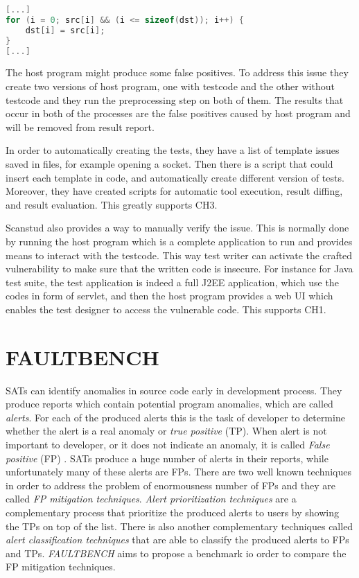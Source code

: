 \documentclass[authoryear,preprint]{sigplanconf}
\begin{document}
\begin{lstlisting}[float,caption=Off-by-one vulnerability caused by insecure loop condition \cite{Scanstud} ,label=ls:sourcec,language=C]
[...]
for (i = 0; src[i] && (i <= sizeof(dst)); i++) {
	dst[i] = src[i];
}
[...]
\end{lstlisting}

The host program might produce some false positives. To address this issue they create two versions of host program, one with testcode and the other without testcode and they run the preprocessing step on both of them. The results that occur in both of the processes are the false positives caused by host program and will be removed from result report. 

In order to automatically creating the tests, they have a list of template issues saved in files, for example opening a socket. Then there is a script that could insert each template in code, and automatically create different version of tests. Moreover, they have created scripts for automatic tool execution, result diffing, and result evaluation. This greatly supports CH3.

Scanstud also provides a way to manually verify the issue. This is normally done by running the host program which is a complete application to run and provides means to interact with the testcode. This way test writer can activate the crafted vulnerability to make sure that the written code is insecure. For instance for Java test suite, the test application is indeed a full J2EE application, which use the codes in form of servlet, and then the host program provides a web UI which enables the test designer to access the vulnerable code. This supports CH1.

\section{FAULTBENCH}
\label{sec:sec_FAULTBENCH}
SATs can identify anomalies in source code early in development process. They produce reports which contain potential program anomalies, which are called \textit{alerts}. For each of the produced alerts this is the task of developer to determine whether the alert is a real anomaly or \textit{true positive} (TP). When alert is not important to developer, or it does not indicate an anomaly, it is called \textit{False positive} (FP) \cite{ayewah2007evaluating}. SATs produce a huge  number of alerts in their reports, while unfortunately many of these alerts are FPs. There are two well known techniques in order to address the problem of enormousness number of FPs and they are called \textit{FP mitigation techniques}. \textit{Alert prioritization techniques} are a complementary process that prioritize the produced alerts to users by showing the TPs on top of the list. There is also another complementary techniques called  \textit{alert classification techniques} that are able to classify the produced alerts to FPs and TPs. \textit{FAULTBENCH} \cite{heckman2008establishing} aims to propose a benchmark io order to compare the FP mitigation techniques. 
\end{document}
